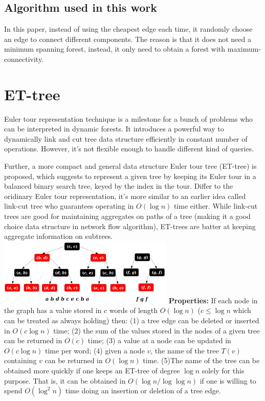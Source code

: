 \documentclass[conference,compsoc]{IEEEtran}
\begin{document}
\subsection{Algorithm used in this work}
	In this paper, instead of using the cheapest edge each time, it randomly choose an edge to connect different components. The reason is that it does not need a minimum spanning forest, instead, it only need to obtain a forest with maximum-connectivity.

\section{ET-tree}
Euler tour representation technique  \cite{715896} is a milestone for a bunch of problems who can be interpreted in dynamic forests. It introduces a powerful way to dynamically link and cut tree data structure efficiently in constant number of operations. However, it's not flexible enough to handle different kind of queries.

Further, a more compact and general data structure Euler tour tree \cite{Henzinger:1995:RDG:225058.225269} (ET-tree) is proposed, which suggests to represent a given tree by keeping its Euler tour in a balanced binary search tree, keyed by the index in the tour. Differ to the oridinary Euler tour representation, it's more similar to an earlier idea called link-cut tree\cite{Sleator:1985:SBS:3828.3835} who guarantees operating in $O(\log n)$ time either. While link-cut trees are good for maintaining aggregates on paths of a tree (making it a good choice data structure in network flow algorithm), ET-trees are batter at keeping aggregate information on subtrees.
\includegraphics[height=3.2cm]{Pic/ET-tree.png}
\textbf{Properties:}
If each node in the graph has a value stored in $c$ words of length $O(\log n)$ ($c\leq \log n$ which can be treated as always holding) then: 
(1) a tree edge can be deleted or inserted in $O(c \log n)$ time;
(2) the sum of the values stored in the nodes of a given tree can be returned in $O(c)$ time; 
(3) a value at a node can be updated in $O(c \log n)$ time per word; 
(4) given a node $v$, the name of the tree $T(v)$ containing $v$ can be returned in $O(\log n)$ time. 
(5)The name of the tree can be obtained more quickly if one keeps an ET-tree of degree $\log n$ solely for this purpose. That is, it can be obtained in $O(\log n/ \log \log n)$ if one is willing to spend $O(\log^2 n)$ time doing an insertion or deletion of a tree edge.
\end{document}
